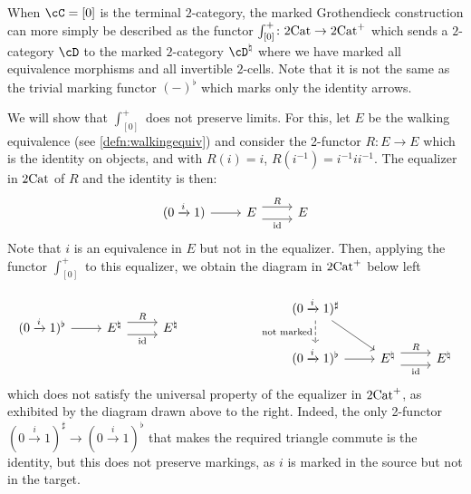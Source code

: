 \documentclass[11pt, dvipsnames]{amsart}
\begin{document}
    \begin{ex}  \label{rmk:example_marking_equivs_not_radjoint}
    When $\cC=[0]$ is the terminal $2$-category, the marked Grothendieck construction can more simply be described as the functor $\int_{[0]}^+ \colon 2\mathrm{Cat} \to  2\mathrm{Cat}^+ $ which sends a $2$-category $\cD$ to the marked $2$-category $\cD^{\natural}$ where we have marked all equivalence morphisms and all invertible $2$-cells. Note that it is not the same as the trivial marking functor $(-)^\flat$ which marks only the identity arrows. 

    We will show that $\int_{[0]}^+$ does not preserve limits. For this, let $E$ be the walking equivalence (see \cref{defn:walkingequiv}) and consider the 2-functor $R\colon E \to E$ which is the identity on objects, and with $R(i)=i$, $R(i^{-1})=i^{-1}  i  i^{-1}$. The equalizer in $2\mathrm{Cat}$ of $R$ and the identity is then:
            \[\begin{tikzcd}[ampersand replacement=\&]
                {(0\xrightarrow{i} 1)} \& E \& E
                \arrow[from=1-1, to=1-2]
                \arrow["R", shift left=2, from=1-2, to=1-3]
                \arrow["{\id}"', shift right=2, from=1-2, to=1-3]
            \end{tikzcd}\]
            Note that $i$ is an equivalence in $E$ but not in the equalizer. Then, applying the functor $\int_{[0]}^+$ to this equalizer, we obtain the  diagram in $2\mathrm{Cat}^+$ below left
            
             \[\begin{tikzcd}
                 {(0\xrightarrow{i} 1)^\flat} & {E^{\natural}} & {E^{\natural}}
                 \arrow[from=1-1, to=1-2]
                 \arrow["{R}", shift left=2, from=1-2, to=1-3]
                 \arrow["{\id}"', shift right=2, from=1-2, to=1-3]
             \end{tikzcd}\qquad \qquad \qquad
            \begin{tikzcd}
                {(0\xrightarrow{i} 1)^\sharp} \\
                {(0\xrightarrow{i} 1)^\flat} & {E^{\natural}} & {E^{\natural}}
                \arrow["{\textrm{not marked}}"', dashed, from=1-1, to=2-1]
                \arrow[from=1-1, to=2-2]
                \arrow[from=2-1, to=2-2]
                \arrow["{R}", shift left=2, from=2-2, to=2-3]
                \arrow["{\id}"', shift right=2, from=2-2, to=2-3]
            \end{tikzcd}\]
             which does not satisfy the universal property of the equalizer in $2\mathrm{Cat}^+$, as exhibited by the diagram drawn above to the right. Indeed, the only 2-functor $(0\xrightarrow{i} 1)^\sharp\to (0\xrightarrow{i} 1)^\flat$ that makes the required triangle commute is the identity, but this does not preserve markings, as $i$ is marked in the source but not in the target.
        \end{ex}
\end{document}
